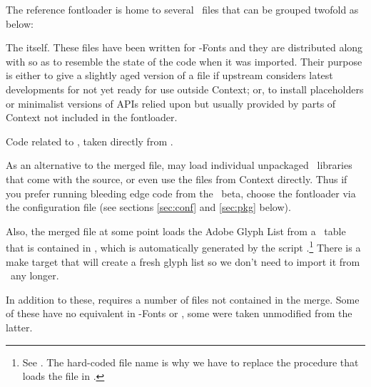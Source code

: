 The reference fontloader is home to several \Lua\ files that can be
grouped twofold as below:

\begindefinitions
  \beginnormalitem
    The  itself.
    These files have been written for \LuaTeX-Fonts and they are
    distributed along with  so as to resemble
    the state of the code when it was imported. Their purpose is either
    to give a slightly aged version of a file if upstream considers
    latest developments for not yet ready for use outside Context; or,
    to install placeholders or minimalist versions of APIs relied upon
    but usually provided by parts of Context not included in the
    fontloader.
    \begindoublecolumns
      \begindefinitions
      \enddefinitions
    \enddoublecolumns
  \endnormalitem

  \beginnormalitem
    Code related to , taken
    directly from \ConTeXt.
    \begindoublecolumns
      \begindefinitions
      \enddefinitions
    \enddoublecolumns
  \endnormalitem
\enddefinitions

As an alternative to the merged file,  may load
individual unpackaged \Lua\ libraries that come with the source, or even
use the files from Context directly.
%
Thus if you prefer running bleeding edge code from the \ConTeXt\ beta,
choose the  fontloader via the configuration file
(see sections \ref{sec:conf} and \ref{sec:pkg} below).

Also, the merged file at some point loads the Adobe Glyph List from a
\Lua\ table that is contained in ,
which is automatically generated by the script
.\footnote{%
  See .
  The hard-coded file name is why we have to replace the procedure
  that loads the file in .
}
%
There is a make target  that will create a fresh
glyph list so we don’t need to import it from \ConTeXt\ any longer.

In addition to these,  requires a number of
files not contained in the merge. Some of these have no equivalent in
\LuaTeX-Fonts or \ConTeXt, some were taken unmodified from the latter.


